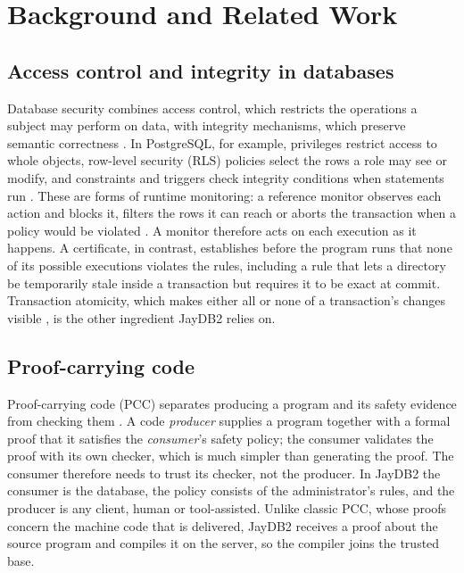 \documentclass[12pt]{article}
\begin{document}
\section{Background and Related Work}
\label{sec:background}
\subsection{Access control and integrity in databases}
Database security combines access control, which restricts the operations a
subject may perform on data, with integrity mechanisms, which preserve semantic
correctness \cite{bertino2005}. In PostgreSQL, for example, privileges restrict
access to whole objects, row-level security (RLS) policies select the rows a role
may see or modify, and constraints and triggers check integrity conditions when
statements run \cite{postgresprivileges,postgresrls,postgresconstraints,postgrestrigger}.
These are forms of runtime monitoring: a reference monitor observes each action
and blocks it, filters the rows it can reach or aborts the transaction when a
policy would be violated \cite{schneider2000}. A monitor therefore acts on each
execution as it happens. A certificate, in contrast, establishes before the program runs that
none of its possible executions violates the rules, including a rule that lets a
directory be temporarily stale inside a transaction but requires it to be exact
at commit. Transaction
atomicity, which makes either all or none of a transaction's changes visible
\cite{haerder1983}, is the other ingredient JayDB2 relies on.

\subsection{Proof-carrying code}
Proof-carrying code (PCC) separates producing a program and its safety evidence
from checking them \cite{necula1996,necula1997}. A code \emph{producer}
supplies a program together with a formal proof that it satisfies the
\emph{consumer}'s safety policy; the consumer validates the proof with its own
checker, which is much simpler than generating the proof. The consumer therefore
needs to trust its checker, not the producer. In JayDB2 the consumer is the
database, the policy consists of the administrator's rules, and the producer is
any client, human or tool-assisted. Unlike classic PCC, whose proofs concern the
machine code that is delivered, JayDB2 receives a proof about the source program
and compiles it on the server, so the compiler joins the trusted base.
\end{document}
